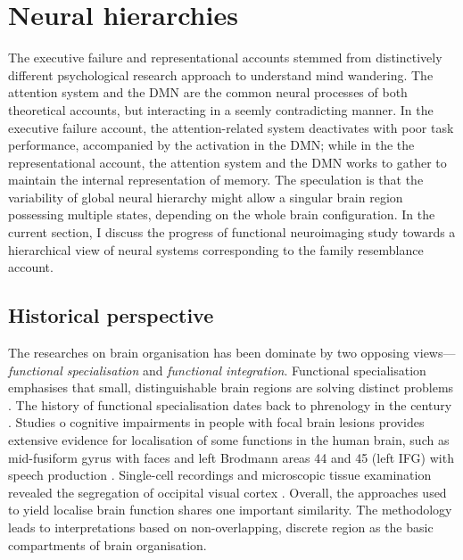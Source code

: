 \section{Neural hierarchies}
\label{ch:intro:neural}

The executive failure and representational accounts stemmed from distinctively different psychological research approach to understand mind wandering. The attention system and the DMN are the common neural processes of both theoretical accounts, but interacting in a seemly contradicting manner. In the executive failure account, the attention-related system deactivates with poor task performance, accompanied by the activation in the DMN; while in the the representational account, the attention system and the DMN works to gather to maintain the internal representation of memory. The speculation is that the variability of global neural hierarchy might allow a singular brain region possessing multiple states, depending on the whole brain configuration. In the current section, I discuss the progress of functional neuroimaging study towards a hierarchical view of neural systems corresponding to the family resemblance account.

\subsection{Historical perspective}

The researches on brain organisation has been dominate by two opposing views---\textit{functional specialisation} and \textit{functional integration}. Functional specialisation emphasises that small, distinguishable brain regions are solving distinct problems \cite{Kanwisher2010}. The history of functional specialisation dates back to phrenology in the  century \cite<for more history about functional localisation, see supporting information in>{Kanwisher2010}. Studies o cognitive impairments in people with focal brain lesions provides extensive evidence for localisation of some functions in the human brain, such as mid-fusiform gyrus with faces \cite{Iaria2008} and left Brodmann areas 44 and 45 (left IFG) with speech production \cite{Broca1861}. Single-cell recordings and microscopic tissue examination revealed the segregation of occipital visual cortex \cite{Zeki1978}. Overall, the approaches used to yield localise brain function shares one important similarity. The methodology leads to interpretations based on non-overlapping, discrete region as the basic compartments of brain organisation. 

